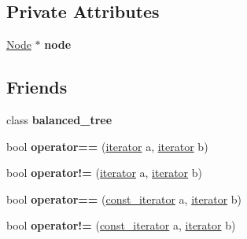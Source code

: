 \subsection*{Private Attributes}
\begin{DoxyCompactItemize}
\item 
\hypertarget{classbalanced__tree_1_1iterator_a8d8f17c18ed93edf31f72d2f86eaf55f}{\hyperlink{structbalanced__tree_1_1Node}{Node} $\ast$ {\bfseries node}}\label{classbalanced__tree_1_1iterator_a8d8f17c18ed93edf31f72d2f86eaf55f}

\end{DoxyCompactItemize}
\subsection*{Friends}
\begin{DoxyCompactItemize}
\item 
\hypertarget{classbalanced__tree_1_1iterator_a080cd3957bad1460e07534ae55222a40}{class {\bfseries balanced\+\_\+tree}}\label{classbalanced__tree_1_1iterator_a080cd3957bad1460e07534ae55222a40}

\item 
\hypertarget{classbalanced__tree_1_1iterator_a9571765a26b5811158d96844ba794b8d}{bool {\bfseries operator==} (\hyperlink{classbalanced__tree_1_1iterator}{iterator} a, \hyperlink{classbalanced__tree_1_1iterator}{iterator} b)}\label{classbalanced__tree_1_1iterator_a9571765a26b5811158d96844ba794b8d}

\item 
\hypertarget{classbalanced__tree_1_1iterator_a12c4b83c21cdcd0e597aa4a952a8a11f}{bool {\bfseries operator!=} (\hyperlink{classbalanced__tree_1_1iterator}{iterator} a, \hyperlink{classbalanced__tree_1_1iterator}{iterator} b)}\label{classbalanced__tree_1_1iterator_a12c4b83c21cdcd0e597aa4a952a8a11f}

\item 
\hypertarget{classbalanced__tree_1_1iterator_ac7d0a4fe4f0cbc4fb8aec9a34be0cecb}{bool {\bfseries operator==} (\hyperlink{classbalanced__tree_1_1const__iterator}{const\+\_\+iterator} a, \hyperlink{classbalanced__tree_1_1iterator}{iterator} b)}\label{classbalanced__tree_1_1iterator_ac7d0a4fe4f0cbc4fb8aec9a34be0cecb}

\item 
\hypertarget{classbalanced__tree_1_1iterator_a711b9d5f5ade7202c48b088b9c64b906}{bool {\bfseries operator!=} (\hyperlink{classbalanced__tree_1_1const__iterator}{const\+\_\+iterator} a, \hyperlink{classbalanced__tree_1_1iterator}{iterator} b)}\label{classbalanced__tree_1_1iterator_a711b9d5f5ade7202c48b088b9c64b906}


\end{DoxyCompactItemize}
